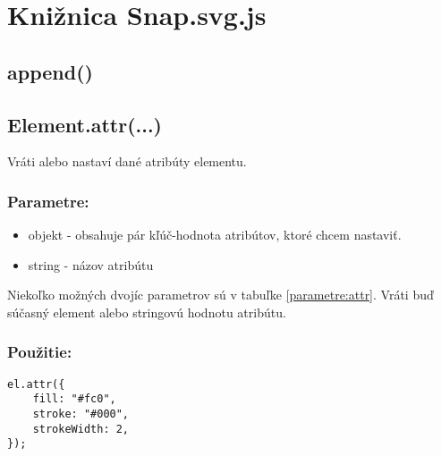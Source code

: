 \chapter{Knižnica Snap.svg.js}




\section{append()}






\section{Element.attr(...)}
Vráti alebo nastaví dané atribúty elementu.

\subsection{Parametre:}
\begin{itemize}
	\item objekt - obsahuje pár kľúč-hodnota atribútov, ktoré chcem nastaviť.
	\item string - názov atribútu
\end{itemize}
 Niekoľko možných dvojíc parametrov sú v tabuľke \ref{parametre:attr}. Vráti buď súčasný element alebo stringovú hodnotu atribútu.

\subsection{
Použitie:}
\begin{lstlisting}
el.attr({
	fill: "#fc0",
	stroke: "#000",
	strokeWidth: 2, 
});
\end{lstlisting}


